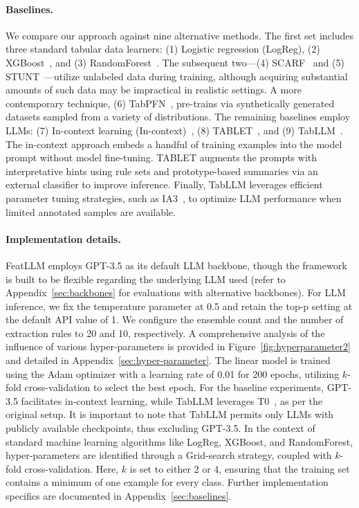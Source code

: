 \vspace*{-0.12in}
\paragraph{Baselines.}
We compare our approach against nine alternative methods. The first set includes three standard tabular data learners: (1) Logistic regression (LogReg), (2) XGBoost~\cite{chen2016xgboost}, and (3) RandomForest~\cite{ho1995random}. The subsequent two—(4) SCARF~\cite{bahri2022scarf} and (5) STUNT~\cite{nam2023stunt}—utilize unlabeled data during training, although acquiring substantial amounts of such data may be impractical in realistic settings. A more contemporary technique, (6) TabPFN~\cite{hollmann2022tabpfn}, pre-trains via synthetically generated datasets sampled from a variety of distributions. The remaining baselines employ LLMs: (7) In-context learning (In-context)~\cite{wei2022emergent}, (8) TABLET~\cite{slack2023tablet}, and (9) TabLLM~\cite{hegselmann2023tabllm}. The in-context approach embeds a handful of training examples into the model prompt without model fine-tuning. TABLET augments the prompts with interpretative hints using rule sets and prototype-based summaries via an external classifier to improve inference. Finally, TabLLM leverages efficient parameter tuning strategies, such as IA3~\cite{liu2022few}, to optimize LLM performance when limited annotated samples are available.

\vspace*{-0.12in}
\paragraph{Implementation details.}
\textsf{FeatLLM} employs GPT-3.5 as its default LLM backbone, though the framework is built to be flexible regarding the underlying LLM used (refer to Appendix~\ref{sec:backbones} for evaluations with alternative backbones). For LLM inference, we fix the temperature parameter at 0.5 and retain the top-p setting at the default API value of 1. We configure the ensemble count and the number of extraction rules to 20 and 10, respectively. A comprehensive analysis of the influence of various hyper-parameters is provided in Figure~\ref{fig:hyperparameter2} and detailed in Appendix~\ref{sec:hyper-parameter}. The linear model is trained using the Adam optimizer with a learning rate of 0.01 for 200 epochs, utilizing $k$-fold cross-validation to select the best epoch. For the baseline experiments, GPT-3.5 facilitates in-context learning, while TabLLM leverages T0~\cite{sanh2022multitask}, as per the original setup. It is important to note that TabLLM permits only LLMs with publicly available checkpoints, thus excluding GPT-3.5. In the context of standard machine learning algorithms like LogReg, XGBoost, and RandomForest, hyper-parameters are identified through a Grid-search strategy, coupled with $k$-fold cross-validation. Here, $k$ is set to either 2 or 4, ensuring that the training set contains a minimum of one example for every class. Further implementation specifics are documented in Appendix~\ref{sec:baselines}.


